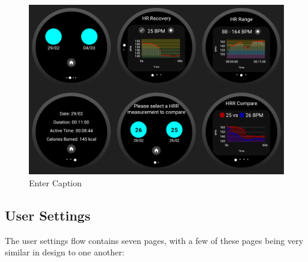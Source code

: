 \documentclass{l4proj}
\begin{document}
\begin{figure}[h!]
    \centering
    \includegraphics[width=1\linewidth]{dissertation//dissImages/HealthHistoryCombined.png}
    \caption{Enter Caption}
    \label{fig:enter-label}
\end{figure}

\subsection{User Settings}

The user settings flow contains seven pages, with a few of these pages being very similar in design to one another:
\end{document}
